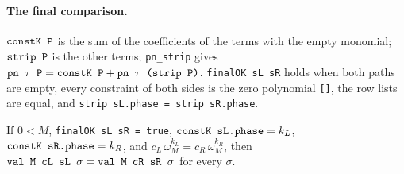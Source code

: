 \paragraph{The final comparison.} $\textnormal{\texttt{constK P}}$ is the sum of the coefficients of the terms with
the empty monomial; $\textnormal{\texttt{strip P}}$ is the other terms; \textnormal{\texttt{pn\_\allowbreak{}strip}} gives
$\textnormal{\texttt{pn \ensuremath{\tau} P}} = \textnormal{\texttt{constK P}} + \textnormal{\texttt{pn \ensuremath{\tau} (\allowbreak{}strip P)}}$. \textnormal{\texttt{finalOK sL sR}} holds when both
paths are empty, every constraint of both sides is the zero polynomial \textnormal{\texttt{[]}}, the row lists are
equal, and \textnormal{\texttt{strip sL.\allowbreak{}phase = strip sR.\allowbreak{}phase}}.
\begin{theorem}
If $0<M$, \textnormal{\texttt{finalOK sL sR = true}}, $\textnormal{\texttt{constK sL.\allowbreak{}phase}} = k_L$,
$\textnormal{\texttt{constK sR.\allowbreak{}phase}} = k_R$, and $c_L\,\omega_M^{k_L} = c_R\,\omega_M^{k_R}$, then
$\textnormal{\texttt{val M cL sL \ensuremath{\sigma}}} = \textnormal{\texttt{val M cR sR \ensuremath{\sigma}}}$ for every $\sigma$.
\end{theorem}

